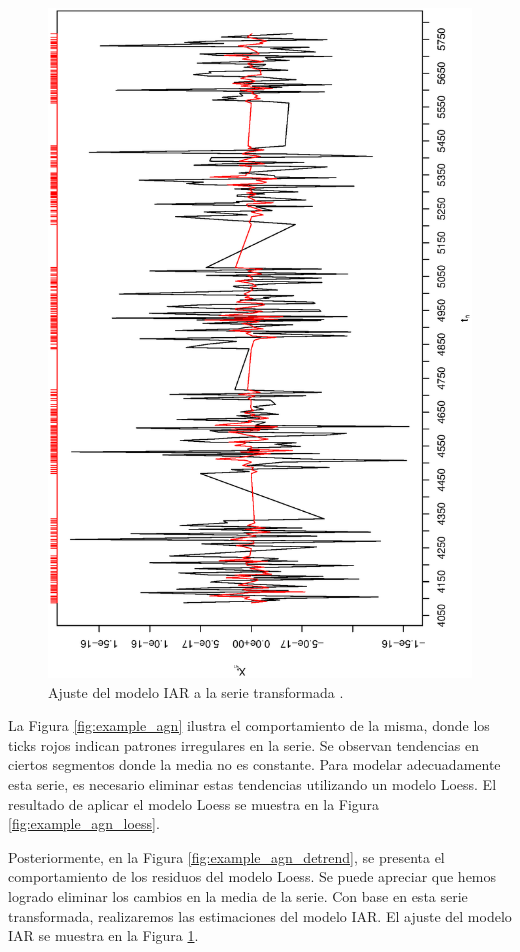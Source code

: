 \begin{figure}[h]
\begin{minipage}{0.45\textwidth}
        \includegraphics[width=0.8\linewidth,angle = 270]{Kap3/Fig_Cap3/agn_ajuste.eps}
        \caption{Ajuste del modelo IAR a la serie transformada .}
        \label{fig:agn_ajuste}
    \end{minipage}
\end{figure}

La Figura \ref{fig:example_agn} ilustra el comportamiento de la misma, donde los ticks rojos indican patrones irregulares en la serie. Se observan tendencias en ciertos segmentos donde la media no es constante. Para modelar adecuadamente esta serie, es necesario eliminar estas tendencias utilizando un modelo Loess. El resultado de aplicar el modelo Loess se muestra en la Figura \ref{fig:example_agn_loess}.

Posteriormente, en la Figura \ref{fig:example_agn_detrend}, se presenta el comportamiento de los residuos del modelo Loess. Se puede apreciar que hemos logrado eliminar los cambios en la media de la serie. Con base en esta serie transformada, realizaremos las estimaciones del modelo IAR. El ajuste del modelo IAR se muestra en la Figura \ref{fig:agn_ajuste}.

